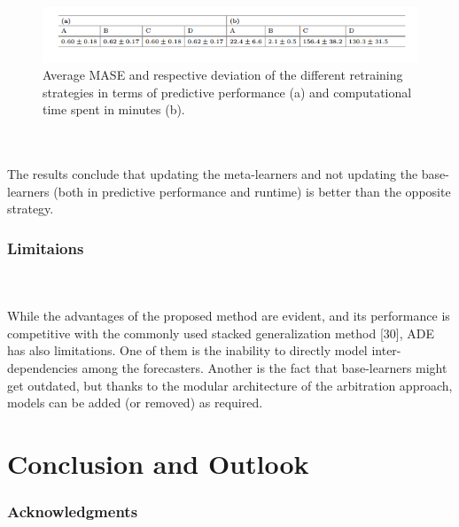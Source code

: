 \documentclass[runningheads,a4paper]{llncs}[2015/06/24]
\begin{document}
\begin{figure}[h]
\centering
\includegraphics[width=\textwidth]{trainingStrategies}
\caption{ Average MASE and respective deviation of the different retraining strategies in terms of predictive performance (a) and computational time spent in minutes (b).}
\label{fig:training Strategies}
\end{figure}

\hspace{1cm}\\\\
The results conclude that updating the meta-learners and not updating the base-learners (both in predictive performance and runtime) is better than the opposite strategy.

\subsubsection{Limitaions}
\hspace{1cm}\\\\ While the advantages of the proposed method are evident, and its performance is competitive with the commonly used stacked generalization method [30], ADE has also limitations. One of them is the inability to directly model inter-dependencies among the forecasters. Another is the fact that base-learners might get outdated, but thanks to the modular architecture of the arbitration approach, models can be added (or removed) as required.

\section{Conclusion and Outlook}

\subsubsection{Acknowledgments}




\end{document}
